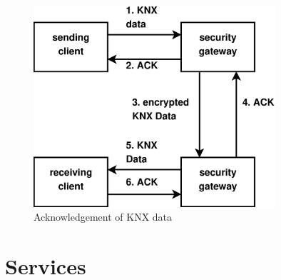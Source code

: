 \begin{figure}
  \centering
    \includegraphics[width=0.8\textwidth]{figures/dataAck.eps}
 \caption{Acknowledgement of KNX data}
 \label{fig:dataAck}
\end{figure}

\section{Services}

